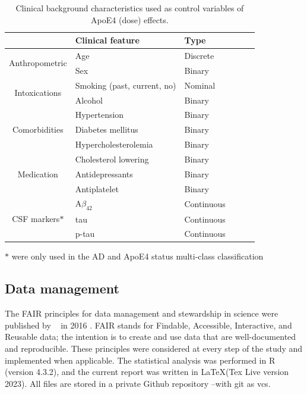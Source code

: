 \documentclass{amsart}
\begin{document}
\begin{table}[htb]
\caption{Clinical background characteristics used as control variables of ApoE4 (dose) effects.}
\label{tab:clin}
\begin{threeparttable}
\begin{tabular}{clllll} \toprule
                                & \textbf{Clinical feature}   & \textbf{Type} \\ \midrule
\multirow{2}{*}{Anthropometric} & Age                         & Discrete      \\
                                & Sex                         & Binary        \\
\multirow{2}{*}{Intoxications}  & Smoking (past, current, no) & Nominal       \\
                                & Alcohol                     & Binary        \\
\multirow{3}{*}{Comorbidities}  & Hypertension                & Binary        \\
                                & Diabetes mellitus           & Binary        \\
                                & Hypercholesterolemia        & Binary        \\
\multirow{3}{*}{Medication}     & Cholesterol lowering        & Binary       \\
                                & Antidepressants             & Binary        \\
                                & Antiplatelet                & Binary        \\ 
\multirow{3}{*}{CSF markers$\ast$}    & A$\beta_{42}$               & Continuous       \\
                                & tau                         & Continuous       \\
                                & p-tau                       & Continuous       \\\bottomrule
\end{tabular}
\begin{tablenotes}
  \item[$\ast$] were only used in the AD and ApoE4 status multi-class classification
\end{tablenotes}
\end{threeparttable}
\end{table}

\subsection{Data management}\label{datamanagement}
The FAIR principles for data management and stewardship in science were published by  ~\citeauthor{Wilkinson2016TheStewardship} in 2016 \cite{Wilkinson2016TheStewardship}. FAIR stands for Findable, Accessible, Interactive, and Reusable data; the intention is to create and use data that are well-documented and reproducible. These principles were considered at every step of the study and implemented when applicable. The statistical analysis was performed in R (version 4.3.2), and the current report was written in \LaTeX  (Tex Live version 2023). All files are stored in a private Github repository --with git as \acrfull{vcs}.
\end{document}
